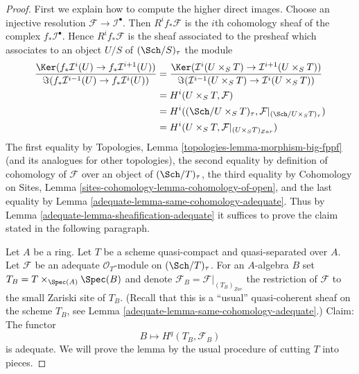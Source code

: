 \begin{proof}

First we explain how to compute the higher direct images.
Choose an injective resolution $\mathcal{F} \to \mathcal{I}^\bullet$.
Then $R^if_*\mathcal{F}$ is the $i$th cohomology sheaf of the
complex $f_*\mathcal{I}^\bullet$.
Hence $R^if_*\mathcal{F}$ is the sheaf associated to the presheaf
which associates to an object $U/S$ of $(\Sch/S)_\tau$
the module
\begin{align*}
\frac{\Ker(f_*\mathcal{I}^i(U) \to f_*\mathcal{I}^{i + 1}(U))}
{\Im(f_*\mathcal{I}^{i - 1}(U) \to f_*\mathcal{I}^i(U))}
& =
\frac{\Ker(\mathcal{I}^i(U \times_S T) \to
\mathcal{I}^{i + 1}(U \times_S T))}
{\Im(\mathcal{I}^{i - 1}(U \times_S T) \to \mathcal{I}^i(U \times_S T))}
\\
& =
H^i(U \times_S T, \mathcal{F}) \\
& = H^i((\Sch/U \times_S T)_\tau,
\mathcal{F}|_{(\Sch/U \times_S T)_\tau}) \\
& = H^i(U \times_S T, \mathcal{F}|_{(U \times_S T)_{Zar}})
\end{align*}
The first equality by
Topologies, Lemma \ref{topologies-lemma-morphism-big-fppf}
(and its analogues for other topologies),
the second equality by definition of cohomology of $\mathcal{F}$
over an object of $(\Sch/T)_\tau$,
the third equality by
Cohomology on Sites, Lemma \ref{sites-cohomology-lemma-cohomology-of-open},
and the last equality by
Lemma \ref{adequate-lemma-same-cohomology-adequate}.
Thus by
Lemma \ref{adequate-lemma-sheafification-adequate}
it suffices to prove the claim stated in the following paragraph.

\medskip\noindent
Let $A$ be a ring. Let $T$ be a scheme quasi-compact and quasi-separated
over $A$. Let $\mathcal{F}$ be an adequate $\mathcal{O}_T$-module on
$(\Sch/T)_\tau$. For an $A$-algebra $B$ set
$T_B = T \times_{\Spec(A)} \Spec(B)$ and denote
$\mathcal{F}_B = \mathcal{F}|_{(T_B)_{Zar}}$ the restriction of
$\mathcal{F}$ to the small Zariski site of $T_B$.
(Recall that this is a ``usual'' quasi-coherent sheaf on the scheme
$T_B$, see
Lemma \ref{adequate-lemma-same-cohomology-adequate}.)
Claim: The functor
$$
B \longmapsto H^q(T_B, \mathcal{F}_B)
$$
is adequate. We will prove the lemma by the usual
procedure of cutting $T$ into pieces.


\end{proof}
